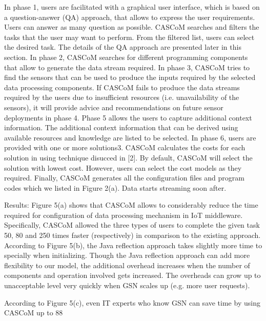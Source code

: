In phase 1, users are facilitated with a graphical user interface, which is based on a question-answer (QA) approach, that allows to express the user requirements. Users can answer as many question as possible. CASCoM searches and filters the tasks that the user may want to perform. From the filtered list, users can select the desired task. The details of the QA approach are presented later in this section. In phase 2, CASCoM searches for different programming components that allow to generate the data stream required. In phase 3, CASCoM tries to find the sensors that can be used to produce the inputs required by the selected data processing components. If CASCoM fails to produce the data streams required by the users due to insufficient resources (i.e. unavailability of the sensors), it will provide advice and recommendations on future sensor deployments in phase 4. Phase 5 allows the users to capture additional context information. The additional context information that can be derived using available resources and knowledge are listed to be selected. In phase 6, users are provided with one or more solutions3. CASCoM calculates the costs for each solution in using technique disucced in [2]. By default, CASCoM will select the solution with lowest cost. However, users can select the cost models as they required. Finally, CASCoM generates all the configuration files and program codes which we listed in Figure 2(a). Data starts streaming soon after. 


Results: Figure 5(a) shows that CASCoM allows to considerably reduce the time required for configuration of data processing mechanism in IoT middleware. Specifically, CASCoM allowed the three types of users to complete the given task 50, 80 and 250 times faster (respectively) in comparison to the existing approach. According to Figure 5(b), the Java reflection approach takes slightly more time to specially when initializing. Though the Java reflection approach can add more flexibility to our model, the additional overhead increases when the number of components and operation involved gets increased. The overheads can grow up to unacceptable level very quickly when GSN scales up (e.g. more user requests).

According to Figure 5(c), even IT experts who know GSN can save time by using CASCoM up to 88%

